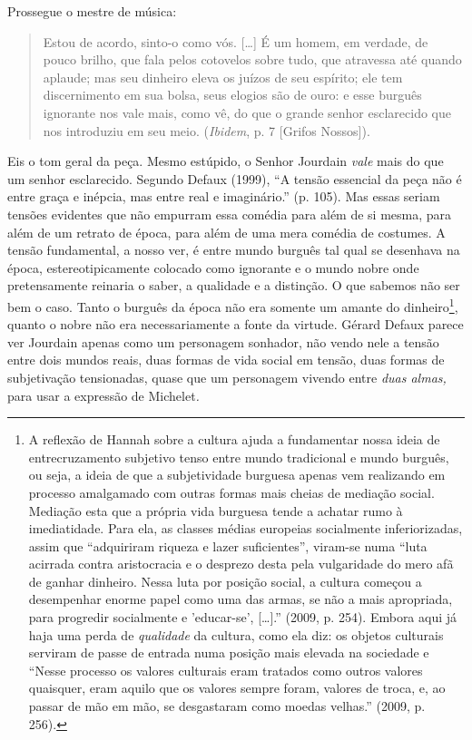 Prossegue o mestre de música:

\begin{quote}
Estou de acordo, sinto-o como vós. {[}\ldots{}{]} É um homem, em
verdade, de pouco brilho, que fala pelos cotovelos sobre tudo, que
atravessa até quando aplaude; mas seu dinheiro eleva os juízos de seu
espírito; ele tem discernimento em sua bolsa, seus elogios são de ouro:
e esse burguês ignorante nos vale mais, como vê, do que o grande senhor
esclarecido que nos introduziu em seu meio. (\emph{Ibidem}, p. 7
{[}Grifos Nossos{]}).
\end{quote}

Eis o tom geral da peça. Mesmo estúpido, o Senhor Jourdain \emph{vale}
mais do que um senhor esclarecido. Segundo Defaux (1999), ``A tensão
essencial da peça não é entre graça e inépcia, mas entre real e
imaginário.'' (p. 105). Mas essas seriam tensões evidentes que não
empurram essa comédia para além de si mesma, para além de um retrato de
época, para além de uma mera comédia de costumes. A tensão fundamental,
a nosso ver, é entre mundo burguês tal qual se desenhava na época,
estereotipicamente colocado como ignorante e o mundo nobre onde
pretensamente reinaria o saber, a qualidade e a distinção. O que sabemos
não ser bem o caso. Tanto o burguês da época não era somente um amante
do dinheiro\footnote{A reflexão de Hannah sobre a cultura ajuda a
  fundamentar nossa ideia de entrecruzamento subjetivo tenso entre mundo
  tradicional e mundo burguês, ou seja, a ideia de que a subjetividade
  burguesa apenas vem realizando em processo amalgamado com outras
  formas mais cheias de mediação social. Mediação esta que a própria
  vida burguesa tende a achatar rumo à imediatidade. Para ela, as
  classes médias europeias socialmente inferiorizadas, assim que
  ``adquiriram riqueza e lazer suficientes'', viram-se numa ``luta
  acirrada contra aristocracia e o desprezo desta pela vulgaridade do
  mero afã de ganhar dinheiro. Nessa luta por posição social, a cultura
  começou a desempenhar enorme papel como uma das armas, se não a mais
  apropriada, para progredir socialmente e 'educar-se',
  {[}\ldots{}{]}.'' (2009, p. 254). Embora aqui já haja uma perda de
  \emph{qualidade} da cultura, como ela diz: os objetos culturais
  serviram de passe de entrada numa posição mais elevada na sociedade e
  ``Nesse processo os valores culturais eram tratados como outros
  valores quaisquer, eram aquilo que os valores sempre foram, valores de
  troca, e, ao passar de mão em mão, se desgastaram como moedas
  velhas.'' (2009, p. 256).}, quanto o nobre não era necessariamente a
fonte da virtude. Gérard Defaux parece ver Jourdain apenas como um
personagem sonhador, não vendo nele a tensão entre dois mundos reais,
duas formas de vida social em tensão, duas formas de subjetivação
tensionadas, quase que um personagem vivendo entre \emph{duas almas,}
para usar a expressão de Michelet\emph{.}

